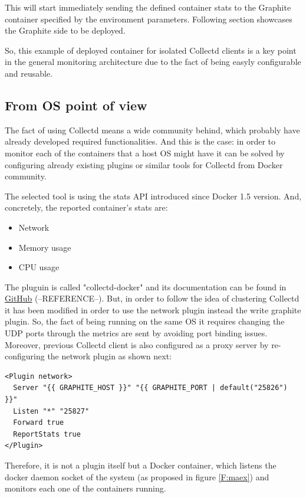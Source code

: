This will start immediately sending the defined container stats to the Graphite container specified by the environment parameters. Following section showcases the Graphite side to be deployed.

So, this example of deployed container for isolated Collectd clients is a key point in the general monitoring architecture due to the fact of being easyly configurable and reusable.

\subsection{From OS point of view}

The fact of using Collectd means a wide community behind, which probably have already developed required functionalities. And this is the case: in order to monitor each of the containers that a host OS might have it can be solved by configuring already existing plugins or similar tools for Collectd from Docker community. 

The selected tool is using the stats API introduced since Docker 1.5 version. And, concretely, the reported container's stats are:
 
\begin{itemize}
\item Network
\item Memory usage
\item CPU usage
\end{itemize}

The pluguin is called "collectd-docker" and its documentation can be found in \href{https://github.com/bobrik/collectd-docker/}{GitHub} (--REFERENCE--). But, in order to follow the idea of clustering Collectd it has been modified in order to use the network plugin instead the write graphite plugin. So, the fact of being running on the same OS it requires changing the UDP ports through the metrics are sent by avoiding port binding issues. Moreover, previous Collectd client is also configured as a proxy server by re-configuring the network plugin as shown next: 

\begin{verbatim}
<Plugin network>
  Server "{{ GRAPHITE_HOST }}" "{{ GRAPHITE_PORT | default("25826") }}"
  Listen "*" "25827"
  Forward true
  ReportStats true
</Plugin>
\end{verbatim}

Therefore, it is not a plugin itself but a Docker container, which listens the docker daemon socket of the system (as proposed in figure \ref{F:maex}) and monitors each one of the containers running.

